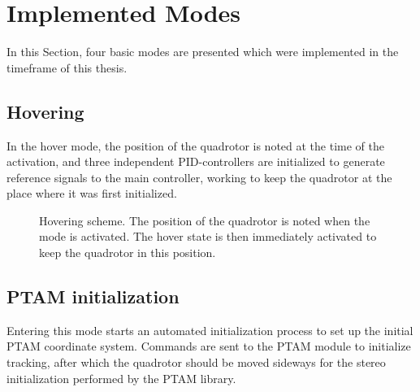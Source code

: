     \section{Implemented Modes}
        In this Section, four basic modes are presented which were implemented
        in the timeframe of this thesis.

        \subsection{Hovering}
            In the hover mode, the position of the quadrotor is noted at
            the time of the activation, and three independent PID-controllers
            are initialized to generate reference signals to the main controller,
            working to keep the quadrotor at the place where it was first initialized.
            \begin{figure}[H]
                \noindent{}
                \caption{Hovering scheme. The position of the quadrotor is noted when the mode is activated. The hover state is then immediately activated to keep the quadrotor in this position.}
                \label{fig:logic:hoverscheme}
            \end{figure}

        \subsection{PTAM initialization}
            Entering this mode starts an automated initialization process
            to set up the initial PTAM coordinate system. Commands are sent
            to the PTAM module to initialize tracking, after which
            the quadrotor should be moved sideways for the
            stereo initialization performed by the PTAM library.

